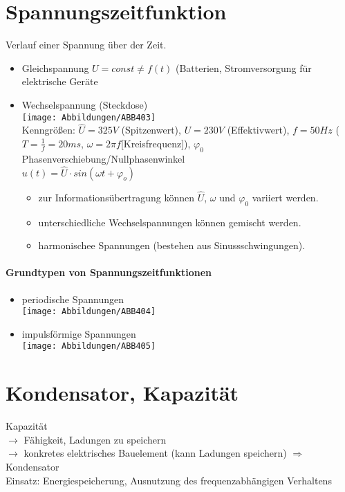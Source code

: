 \documentclass{scrreprt}
\begin{document}
\section{Spannungszeitfunktion}
Verlauf einer Spannung über der Zeit.
\begin{itemize}
\item Gleichspannung $U= const \not = f(t)$ (Batterien, Stromversorgung für elektrische Geräte
\item Wechselspannung (Steckdose)\\
\texttt{[image: Abbildungen/ABB403]}\\
Kenngrößen: $\hat{U}=325V$ (Spitzenwert), $U=230V$ (Effektivwert), $f=50Hz$ ($T=\frac{1}{f}=20ms$, $\omega = 2 \pi f$[Kreisfrequenz]), $\varphi_0$ Phasenverschiebung/Nullphasenwinkel\\
$u(t)=\hat{U}\cdot sin(\omega t+\varphi_o)$
\begin{itemize}
\item zur Informationsübertragung können $\hat{U}$, $\omega$ und $\varphi_0$ variiert werden.
\item unterschiedliche Wechselspannungen können gemischt werden.
\item harmonischee Spannungen (bestehen aus Sinussschwingungen).
\end{itemize}
\end{itemize}

\paragraph{Grundtypen von Spannungszeitfunktionen}
\begin{itemize}
\item periodische Spannungen\\
\texttt{[image: Abbildungen/ABB404]}
\item impulsförmige Spannungen\\
\texttt{[image: Abbildungen/ABB405]}
\end{itemize}

\section{Kondensator, Kapazität}

Kapazität \\
$\rightarrow$ Fähigkeit, Ladungen zu speichern\\
$\rightarrow$ konkretes elektrisches Bauelement (kann Ladungen speichern) $\Rightarrow$ Kondensator \medskip\\
Einsatz: Energiespeicherung, Ausnutzung des frequenzabhängigen Verhaltens
\end{document}

